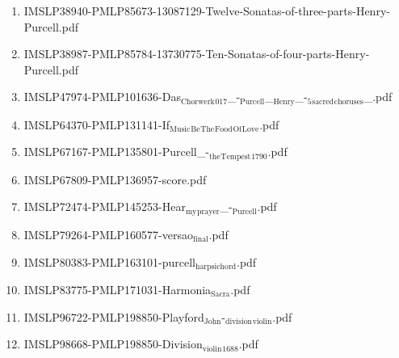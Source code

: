 \documentclass[11pt]{article}
\begin{document}
\begin{enumerate}
\item IMSLP38940-PMLP85673-13087129-Twelve-Sonatas-of-three-parts-Henry-Purcell.pdf
\label{sec-1-1-1-1-44-52-14}

\item IMSLP38987-PMLP85784-13730775-Ten-Sonatas-of-four-parts-Henry-Purcell.pdf
\label{sec-1-1-1-1-44-52-15}

\item IMSLP47974-PMLP101636-Das$_{\text{Chorwerk}}$$_{\text{017}}$\_-$_{\text{Purcell}}$\_$_{\text{Henry}}$\_-$_{\text{5}}$$_{\text{sacred}}$$_{\text{choruses}}$\_.pdf
\label{sec-1-1-1-1-44-52-16}

\item IMSLP64370-PMLP131141-If$_{\text{Music}}$$_{\text{Be}}$$_{\text{The}}$$_{\text{Food}}$$_{\text{Of}}$$_{\text{Love}}$.pdf
\label{sec-1-1-1-1-44-52-17}

\item IMSLP67167-PMLP135801-Purcell\_-$_{\text{the}}$$_{\text{Tempest}}$$_{\text{1790}}$.pdf
\label{sec-1-1-1-1-44-52-18}

\item IMSLP67809-PMLP136957-score.pdf
\label{sec-1-1-1-1-44-52-19}

\item IMSLP72474-PMLP145253-Hear$_{\text{my}}$$_{\text{prayer}}$\_-$_{\text{Purcell}}$.pdf
\label{sec-1-1-1-1-44-52-20}

\item IMSLP79264-PMLP160577-versao$_{\text{final}}$.pdf
\label{sec-1-1-1-1-44-52-21}

\item IMSLP80383-PMLP163101-purcell$_{\text{harpsichord}}$.pdf
\label{sec-1-1-1-1-44-52-22}

\item IMSLP83775-PMLP171031-Harmonia$_{\text{Sacra}}$.pdf
\label{sec-1-1-1-1-44-52-23}

\item IMSLP96722-PMLP198850-Playford$_{\text{John}}$-$_{\text{division}}$$_{\text{violin}}$.pdf
\label{sec-1-1-1-1-44-52-24}

\item IMSLP98668-PMLP198850-Division$_{\text{violin}}$$_{\text{1688}}$.pdf
\label{sec-1-1-1-1-44-52-25}
\end{enumerate}
\end{document}
